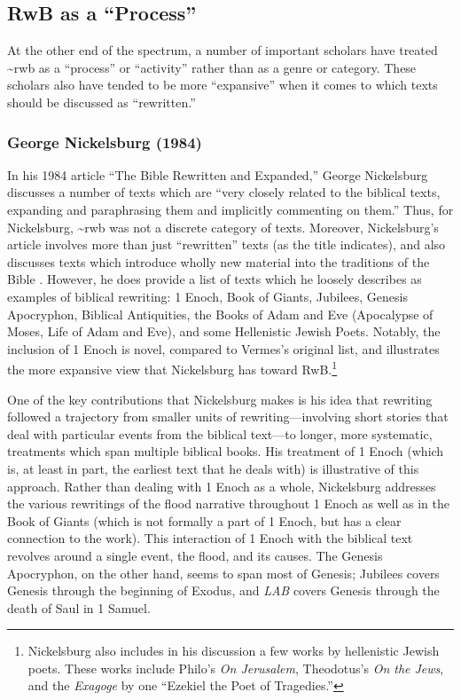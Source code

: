 \subsection{\texorpdfstring{RwB as a
``Process''}{RwB as a Process}}\label{rwb-as-a-process}

At the other end of the spectrum, a number of important scholars have
treated \textasciitilde{}rwb as a ``process'' or ``activity'' rather
than as a genre or category. These scholars also have tended to be more
``expansive'' when it comes to which texts should be discussed as
``rewritten.''

\subsubsection{George Nickelsburg (1984)}\label{george-nickelsburg-1984}

In his 1984 article ``The Bible Rewritten and Expanded,'' George
Nickelsburg discusses a number of texts which are ``very closely related
to the biblical texts, expanding and paraphrasing them and implicitly
commenting on them.''\autocite[89]{nickelsburg_stone1984} Thus, for
Nickelsburg, \textasciitilde{}rwb was not a discrete category of texts.
Moreover, Nickelsburg's article involves more than just ``rewritten''
texts (as the title indicates), and also discusses texts which introduce
wholly new material into the traditions of the Bible
\autocite[89--90]{nickelsburg_stone1984}. However, he does provide a
list of texts which he loosely describes as examples of biblical
rewriting: 1 Enoch, Book of Giants, Jubilees, Genesis Apocryphon,
Biblical Antiquities, the Books of Adam and Eve (Apocalypse of Moses,
Life of Adam and Eve), and some Hellenistic Jewish Poets. Notably, the
inclusion of 1 Enoch is novel, compared to Vermes's original list, and
illustrates the more expansive view that Nickelsburg has toward
RwB.\footnote{Nickelsburg also includes in his discussion a few works by
  hellenistic Jewish poets. These works include Philo's \emph{On
  Jerusalem}, Theodotus's \emph{On the Jews}, and the \emph{Exagoge} by
  one ``Ezekiel the Poet of Tragedies.''}

One of the key contributions that Nickelsburg makes is his idea that
rewriting followed a trajectory from smaller units of
rewriting---involving short stories that deal with particular events
from the biblical text---to longer, more systematic, treatments which
span multiple biblical books. His treatment of 1 Enoch (which is, at
least in part, the earliest text that he deals with) is illustrative of
this approach. Rather than dealing with 1 Enoch as a whole, Nickelsburg
addresses the various rewritings of the flood narrative throughout 1
Enoch as well as in the Book of Giants (which is not formally a part of
1 Enoch, but has a clear connection to the work). This interaction of 1
Enoch with the biblical text revolves around a single event, the flood,
and its causes. The Genesis Apocryphon, on the other hand, seems to span
most of Genesis; Jubilees covers Genesis through the beginning of
Exodus, and \emph{LAB} covers Genesis through the death of Saul in 1
Samuel.

